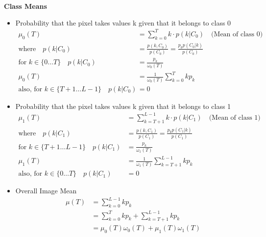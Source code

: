 \noindent \textbf{Class Means} 
\begin{itemize}
  

\item  Probability that the pixel takes values k given that it belongs to class 0
\begin{align*}
\mu_0(T) &= \sum_{k=0}^T k \cdot p(k | C_0)  \quad\text{(Mean of class 0)} \\
\text{where} \quad p(k | C_0) &= \frac{p(k, C_0)}{p(C_0)} = \frac{p_k p(C_0 | k)}{p(C_0)} \\
\text{for } k \in \{ 0\dots T \} \quad p(k | C_0) &= \frac{p_k}{\omega_0(T)} \\
\mu_0(T) &=\frac{1}{\omega_0(T)} \sum_{k=0}^T k p_k \\
\text{also, for } k \in \{ T+1 \dots L-1 \} \quad p(k | C_0) &= 0
\end{align*}
\item Probability that the pixel takes values k given that it belongs to class 1
\begin{align*}
\mu_1(T) &= \sum_{k=T+1}^{L-1} k \cdot p(k | C_1)  \quad\text{(Mean of class 1)} \\
\text{where} \quad p(k | C_1) &= \frac{p(k, C_1)}{p(C_1)} = \frac{p_k p(C_1 | k)}{p(C_1)} \\
\text{for } k \in \{ T+1 \dots L-1 \} \quad p(k | C_1) &= \frac{p_k}{\omega_1(T)} \\
\mu_1(T) &=\frac{1}{\omega_1(T)} \sum_{k=T+1}^{L-1} k p_k \\
\text{also, for } k \in \{ 0 \dots T \} \quad p(k | C_1) &= 0
\end{align*}

\item Overall Image Mean
\begin{align*}
\mu (T) &= \sum_{k=0}^{L-1} k p_k \\
&= \sum_{k=0}^{T} k p_k + \sum_{k=T+1}^{L-1} k p_k\\ 
&= \mu_0(T) \omega_0(T) + \mu_1(T) \omega_1(T)
\end{align*}
\end{itemize}


